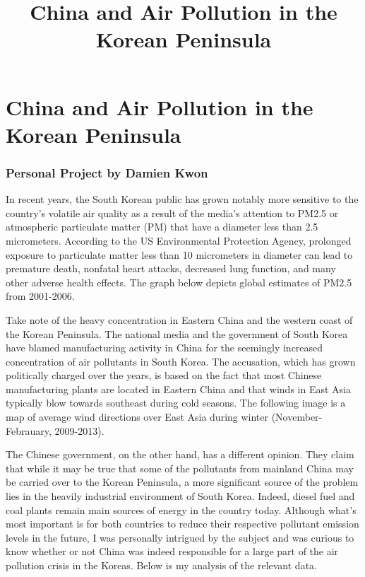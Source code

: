 \documentclass[11pt]{article}
\title{China and Air Pollution in the Korean Peninsula}
\begin{document}
    
    
    \maketitle
    
    

    
    \section{China and Air Pollution in the Korean
Peninsula}\label{china-and-air-pollution-in-the-korean-peninsula}

\subsubsection{Personal Project by Damien
Kwon}\label{personal-project-by-damien-kwon}

In recent years, the South Korean public has grown notably more
sensitive to the country's volatile air quality as a result of the
media's attention to PM2.5 or atmospheric particulate matter (PM) that
have a diameter less than 2.5 micrometers. According to the US
Environmental Protection Agency, prolonged exposure to particulate
matter less than 10 micrometers in diameter can lead to premature death,
nonfatal heart attacks, decreased lung function, and many other adverse
health effects. The graph below depicts global estimates of PM2.5 from
2001-2006.

Take note of the heavy concentration in Eastern China and the western
coast of the Korean Peninsula. The national media and the government of
South Korea have blamed manufacturing activity in China for the
seemingly increased concentration of air pollutants in South Korea. The
accusation, which has grown politically charged over the years, is based
on the fact that most Chinese manufacturing plants are located in
Eastern China and that winds in East Asia typically blow towards
southeast during cold seasons. The following image is a map of average
wind directions over East Asia during winter (November-Febrauary,
2009-2013).

The Chinese government, on the other hand, has a different opinion. They
claim that while it may be true that some of the pollutants from
mainland China may be carried over to the Korean Peninsula, a more
significant source of the problem lies in the heavily industrial
environment of South Korea. Indeed, diesel fuel and coal plants remain
main sources of energy in the country today. Although what's most
important is for both countries to reduce their respective pollutant
emission levels in the future, I was personally intrigued by the subject
and was curious to know whether or not China was indeed responsible for
a large part of the air pollution crisis in the Koreas. Below is my
analysis of the relevant data.
\end{document}
